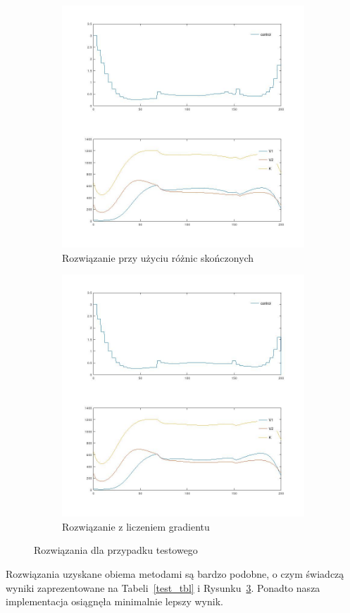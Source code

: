 \documentclass[licencjacka]{pracamgr}
\begin{document}
\begin{figure}[h]
  \begin{subfigure}{.5\textwidth}
    \caption{Rozwiązanie przy użyciu różnic skończonych}\label{nograd_sol}
    \includegraphics[width=\textwidth]{../plots/plot_nograd}
  \end{subfigure}
  \begin{subfigure}{.5\textwidth}
    \caption{Rozwiązanie z liczeniem gradientu}\label{test_sol}
    \includegraphics[width=\textwidth]{../plots/plot_test}
  \end{subfigure}%
  \caption{Rozwiązania dla przypadku testowego}\label{test_nograd_sol}
\end{figure}
Rozwiązania uzyskane obiema metodami są bardzo podobne, o czym świadczą wyniki zaprezentowane na Tabeli~\ref{test_tbl} i Rysunku~\ref{test_nograd_sol}. Ponadto nasza implementacja osiągnęła minimalnie lepszy wynik.
\end{document}
